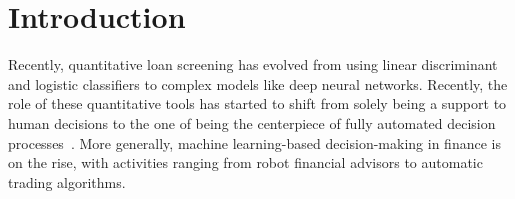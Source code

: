 \documentclass[12pt]{article} %
\begin{document}
%
\section{Introduction}
\label{sec:Intro}
Recently, quantitative loan screening has evolved from using linear discriminant and logistic classifiers to complex models like deep neural networks. 
Recently, the role of these quantitative tools has started to shift from solely being a support to human decisions to the one of being the centerpiece of fully automated decision processes~\citep{zhao2017research}. 
More generally, machine learning-based decision-making in finance is on the rise, with activities ranging from robot financial advisors to automatic trading algorithms. 
\end{document}
